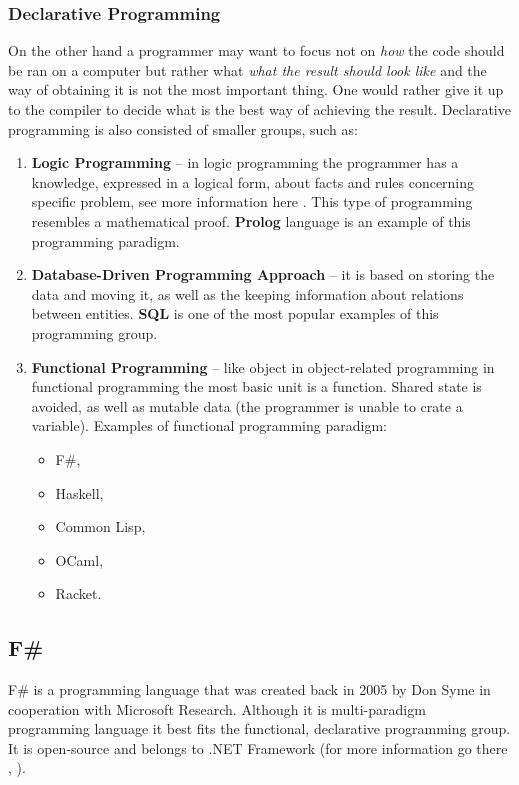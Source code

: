     \subsubsection{Declarative Programming}
    On the other hand a programmer may want to focus not on \textit{how} the code should be ran on a computer but rather what \textit{what the result should look like} and the way of obtaining it is not the most important thing. One would rather give it up to the compiler to decide what is the best way of achieving the result. Declarative programming is also consisted of smaller groups, such as:
    \begin{enumerate}
        \item \textbf{Logic Programming} -- in logic programming the programmer has a knowledge, expressed in a logical form, about facts and rules concerning specific problem, see more information here \cite{logicProgramming}. This type of programming resembles a mathematical proof. \textbf{Prolog} language is an example of this programming paradigm.
        
        \item \textbf{Database-Driven Programming Approach} -- it is based on storing the data and moving it, as well as the keeping information about relations between entities. \textbf{SQL} is one of the most popular examples of this programming group.
        
        \item \textbf{Functional Programming} -- like object in object-related programming in functional programming the most basic unit is a function. Shared state is avoided, as well as mutable data (the programmer is unable to crate a variable). Examples of functional programming paradigm:
            \begin{itemize}
                \item F\#,
                \item Haskell,
                \item Common Lisp,
                \item OCaml,
                \item Racket.
            \end{itemize}
    \end{enumerate}

\subsection{F\#}
    F\# is a programming language that was created back in 2005 by Don Syme in cooperation with Microsoft Research. Although it is multi-paradigm programming language it best fits the functional, declarative programming group. It is open-source and belongs to .NET Framework (for more information go there \cite{WhatIsFSharp},  \cite{FSharpWiki}).
    
